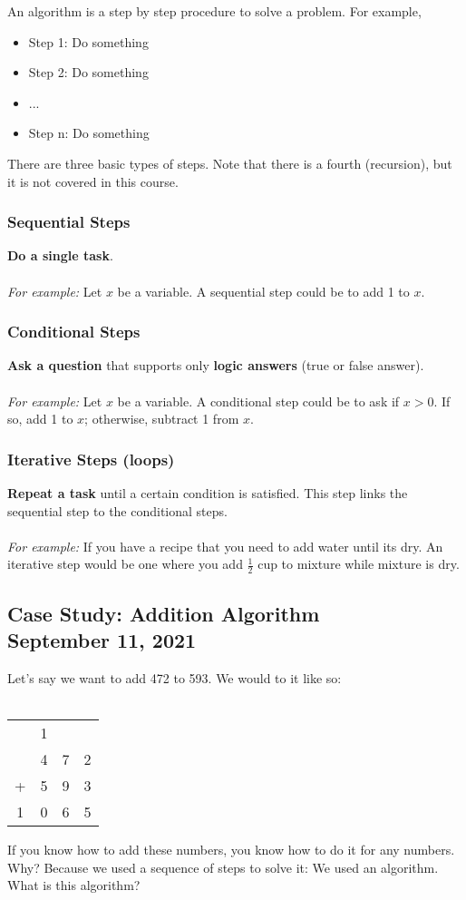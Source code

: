 \documentclass[]{article}
\begin{document}
An algorithm is a step by step procedure to solve a problem. For example, 
\begin{itemize}
	\item Step 1: Do something
	\item Step 2: Do something
	\item ...
	\item Step n: Do something\smallskip
\end{itemize}

\noindent There are three basic types of steps. Note that there is a fourth (recursion), but it is not covered in this course. 
\subsubsection{Sequential Steps}
\bigbreak
	\textbf{Do a single task}.\\\\
	\textit{For example:} Let $x$ be a variable. A sequential step could be to add 1 to $x$.
\subsubsection{Conditional Steps}
\bigbreak
	\textbf{Ask a question} that supports only \textbf{logic answers} (true or false answer). \\\\
	\textit{For example:} Let $x$ be a variable. A conditional step could be to ask if $x > 0$. If so, add 1 to $x$; otherwise, subtract 1 from $x$.
\subsubsection{Iterative Steps (loops)}
\bigbreak
	\textbf{Repeat a task} until a certain condition is satisfied. This step links the sequential step to the conditional steps.\\\\
	\textit{For example:} If you have a recipe that you need to add water until its dry. An iterative step would be one where you add $\frac{1}{2}$ cup to mixture while mixture is dry.


\subsection{Case Study: Addition Algorithm\\ {\normalfont September 11, 2021}}
\bigbreak

Let's say we want to add 472 to 593. We would to it like so:\\\\
\begin{tabular}{cccc}
	& \tiny 1 & \tiny & \tiny \\
	& 4 & 7 & 2 \\
	+ & 5  & 9 & 3 \\
	\hline
	1 & 0 & 6 & 5 \\
\end{tabular}
\medbreak
\noindent If you know how to add these numbers, you know how to do it for any numbers. Why? Because we used a sequence of steps to solve it: We used an algorithm. What is this algorithm?\\
\end{document}
